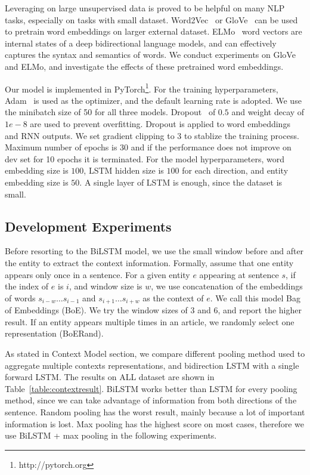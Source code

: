 \documentclass[letterpaper]{article} %
\begin{document}
Leveraging on large unsupervised data is proved to be helpful on many NLP tasks, especially on tasks with small dataset. Word2Vec~\cite{DBLP:journals/corr/abs-1301-3781} or GloVe~\cite{pennington2014glove} can be used to pretrain word embeddings on larger external dataset. ELMo~\cite{Peters:2018} word vectors are internal states of a deep bidirectional language models, and can effectively captures the syntax and semantics of words. We conduct experiments on GloVe and ELMo, and investigate the effects of these pretrained word embeddings.

Our model is implemented in PyTorch\footnote{http://pytorch.org}. For the training hyperparameters, Adam~\cite{kingma2014adam} is used as the optimizer, and the default learning rate is adopted. We use the minibatch size of 50 for all three models. Dropout~\cite{hinton2012improving} of $0.5$ and weight decay of $1e-8$ are used to prevent overfitting. Dropout is applied to word embeddings and RNN outputs. We set gradient clipping to 3 to stablize the training process. Maximum number of epochs is 30 and if the performance does not improve on dev set for 10 epochs it is terminated. For the model hyperparameters, word embedding size is $100$, LSTM hidden size is $100$ for each direction, and entity embedding size is $50$. A single layer of LSTM is enough, since the dataset is small.

\subsection{Development Experiments}

Before resorting to the BiLSTM model, we use the small window before and after the entity to extract the context information. Formally, assume that one entity appears only once in a sentence. For a given entity $e$ appearing at sentence $s$, if the index of $e$ is $i$, and window size is $w$, we use concatenation of the embeddings of words $s_{i-w}\ldots s_{i-1}$ and $s_{i+1}\ldots s_{i+w}$ as the context of $e$. We call this model Bag of Embeddings (BoE). We try the window sizes of 3 and 6, and report the higher result. If an entity appears multiple times in an article, we randomly select one representation (BoERand).

As stated in Context Model section, we compare different pooling method used to aggregate multiple contexts representations, and bidirection LSTM with a single forward LSTM. The results on ALL dataset are shown in Table~\ref{table:contextresult}. BiLSTM works better than LSTM for every pooling method, since we can take advantage of information from both directions of the sentence. Random pooling has the worst result, mainly because a lot of important information is lost. Max pooling has the highest score on most cases, therefore we use BiLSTM + max pooling in the following experiments.
\end{document}
